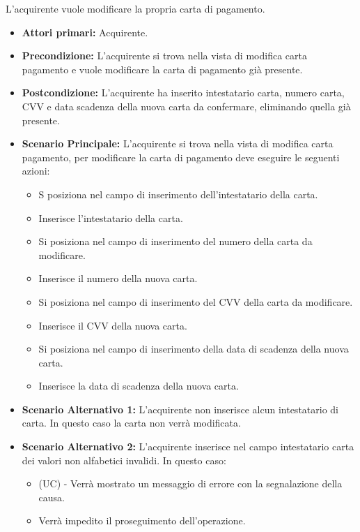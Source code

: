 L'acquirente vuole modificare la propria carta di pagamento.
\begin{itemize}
    \item \textbf{Attori primari:} Acquirente.
    \item \textbf{Precondizione:} L'acquirente si trova nella vista di modifica carta pagamento e vuole modificare la carta di pagamento già presente.
    \item \textbf{Postcondizione:} L'acquirente ha inserito intestatario carta, numero carta, CVV e data scadenza della nuova carta da confermare, eliminando quella già presente.
    \item \textbf{Scenario Principale:} L'acquirente si trova nella vista di modifica carta pagamento, per modificare la carta di pagamento deve eseguire le seguenti azioni:
        \begin{itemize}
            \item S posiziona nel campo di inserimento dell'intestatario della carta.
            \item Inserisce l'intestatario della carta.
            \item Si posiziona nel campo di inserimento del numero della carta da modificare.
            \item Inserisce il numero della nuova carta.
            \item Si posiziona nel campo di inserimento del CVV della carta da modificare.
            \item Inserisce il CVV della nuova carta.
            \item Si posiziona nel campo di inserimento della data di scadenza della nuova carta.
            \item Inserisce la data di scadenza della nuova carta.
        \end{itemize}
    \item \textbf{Scenario Alternativo 1:} L'acquirente non inserisce alcun intestatario di carta. In questo caso la carta non verrà modificata.
    \item \textbf{Scenario Alternativo 2:} L'acquirente inserisce nel campo intestatario carta dei valori non alfabetici invalidi. In questo caso:
    \begin{itemize}
        \item (UC) - Verrà mostrato un messaggio di errore con la segnalazione della causa.
        \item Verrà impedito il proseguimento dell'operazione.
    \end{itemize}    

\end{itemize}

